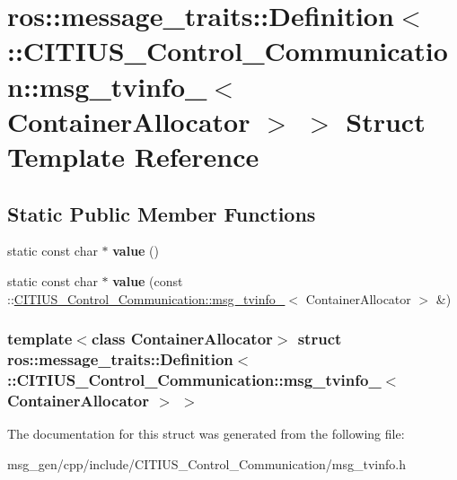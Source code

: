 \hypertarget{structros_1_1message__traits_1_1_definition_3_01_1_1_c_i_t_i_u_s___control___communication_1_1ms0f89d55a8c66bcf027c59a6f62684e46}{\section{ros\-:\-:message\-\_\-traits\-:\-:\-Definition$<$ \-:\-:\-C\-I\-T\-I\-U\-S\-\_\-\-Control\-\_\-\-Communication\-:\-:msg\-\_\-tvinfo\-\_\-$<$ \-Container\-Allocator $>$ $>$ \-Struct \-Template \-Reference}
\label{structros_1_1message__traits_1_1_definition_3_01_1_1_c_i_t_i_u_s___control___communication_1_1ms0f89d55a8c66bcf027c59a6f62684e46}
}
\subsection*{\-Static \-Public \-Member \-Functions}
\begin{DoxyCompactItemize}
\item 
\hypertarget{structros_1_1message__traits_1_1_definition_3_01_1_1_c_i_t_i_u_s___control___communication_1_1ms0f89d55a8c66bcf027c59a6f62684e46_ad519659fcc243b0eb1996420cfeb5e75}{static const char $\ast$ {\bfseries value} ()}\label{structros_1_1message__traits_1_1_definition_3_01_1_1_c_i_t_i_u_s___control___communication_1_1ms0f89d55a8c66bcf027c59a6f62684e46_ad519659fcc243b0eb1996420cfeb5e75}

\item 
\hypertarget{structros_1_1message__traits_1_1_definition_3_01_1_1_c_i_t_i_u_s___control___communication_1_1ms0f89d55a8c66bcf027c59a6f62684e46_a71cc0b4eafa129b3bfafff3dec12d72b}{static const char $\ast$ {\bfseries value} (const \-::\hyperlink{struct_c_i_t_i_u_s___control___communication_1_1msg__tvinfo__}{\-C\-I\-T\-I\-U\-S\-\_\-\-Control\-\_\-\-Communication\-::msg\-\_\-tvinfo\-\_\-}$<$ \-Container\-Allocator $>$ \&)}\label{structros_1_1message__traits_1_1_definition_3_01_1_1_c_i_t_i_u_s___control___communication_1_1ms0f89d55a8c66bcf027c59a6f62684e46_a71cc0b4eafa129b3bfafff3dec12d72b}

\end{DoxyCompactItemize}
\subsubsection*{template$<$class Container\-Allocator$>$ struct ros\-::message\-\_\-traits\-::\-Definition$<$ \-::\-C\-I\-T\-I\-U\-S\-\_\-\-Control\-\_\-\-Communication\-::msg\-\_\-tvinfo\-\_\-$<$ Container\-Allocator $>$ $>$}



\-The documentation for this struct was generated from the following file\-:\begin{DoxyCompactItemize}
\item 
msg\-\_\-gen/cpp/include/\-C\-I\-T\-I\-U\-S\-\_\-\-Control\-\_\-\-Communication/msg\-\_\-tvinfo.\-h\end{DoxyCompactItemize}
